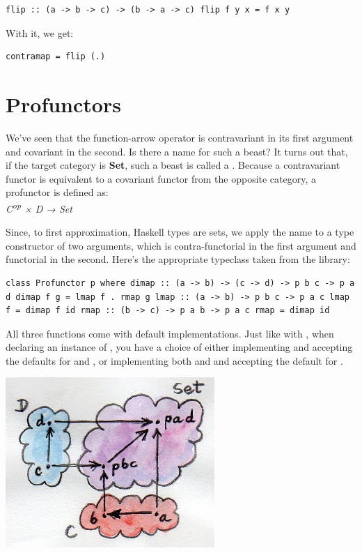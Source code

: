 \begin{verbatim}
flip :: (a -> b -> c) -> (b -> a -> c) flip f y x = f x y
\end{verbatim}

With it, we get:

\begin{verbatim}
contramap = flip (.)
\end{verbatim}

\section{Profunctors}\label{profunctors}

We've seen that the function-arrow operator is contravariant in its
first argument and covariant in the second. Is there a name for such a
beast? It turns out that, if the target category is \textbf{Set}, such a
beast is called a . Because a contravariant functor is
equivalent to a covariant functor from the opposite category, a
profunctor is defined as:\\
\emph{C\textsuperscript{op} × D → Set}

Since, to first approximation, Haskell types are sets, we apply the name
 to a type constructor  of two arguments,
which is contra-functorial in the first argument and functorial in the
second. Here's the appropriate typeclass taken from the
 library:

\begin{verbatim}
class Profunctor p where dimap :: (a -> b) -> (c -> d) -> p b c -> p a d dimap f g = lmap f . rmap g lmap :: (a -> b) -> p b c -> p a c lmap f = dimap f id rmap :: (b -> c) -> p a b -> p a c rmap = dimap id
\end{verbatim}

All three functions come with default implementations. Just like with
, when declaring an instance of ,
you have a choice of either implementing  and accepting
the defaults for  and , or implementing both
 and  and accepting the default for
.

\hypertarget{attachment_4078}{}
\includegraphics[width=3.12500in]{images/dimap.jpg}

